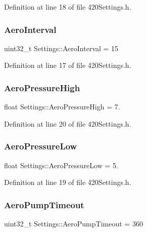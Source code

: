 Definition at line 18 of file 420\+Settings.\+h.

\mbox{\label{struct_settings_acb042ccc3be4d2d87833a3de179b416a}} 
\subsubsection{\texorpdfstring{AeroInterval}{AeroInterval}}
{\footnotesize\ttfamily uint32\+\_\+t Settings\+::\+Aero\+Interval = 15}



Definition at line 17 of file 420\+Settings.\+h.

\mbox{\label{struct_settings_ac7f14ddf251d3305149e41f450a06bbf}} 
\subsubsection{\texorpdfstring{AeroPressureHigh}{AeroPressureHigh}}
{\footnotesize\ttfamily float Settings\+::\+Aero\+Pressure\+High = 7.}



Definition at line 20 of file 420\+Settings.\+h.

\mbox{\label{struct_settings_a1810a4bc777b1d2817330297a541a018}} 
\subsubsection{\texorpdfstring{AeroPressureLow}{AeroPressureLow}}
{\footnotesize\ttfamily float Settings\+::\+Aero\+Pressure\+Low = 5.}



Definition at line 19 of file 420\+Settings.\+h.

\mbox{\label{struct_settings_a0c98b7826925ce351458cde56d5ea43f}} 
\subsubsection{\texorpdfstring{AeroPumpTimeout}{AeroPumpTimeout}}
{\footnotesize\ttfamily uint32\+\_\+t Settings\+::\+Aero\+Pump\+Timeout = 360}



